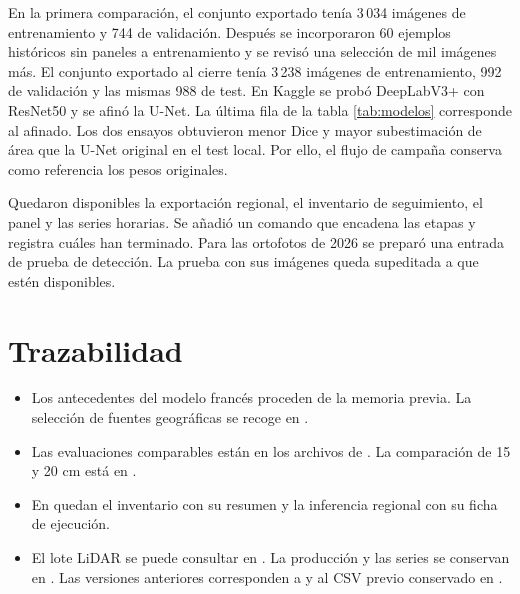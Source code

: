 \documentclass[11pt,a4paper]{article}
\begin{document}
En la primera comparación, el conjunto exportado tenía 3\,034 imágenes de entrenamiento y 744 de validación. Después se incorporaron 60 ejemplos históricos sin paneles a entrenamiento y se revisó una selección de mil imágenes más. El conjunto exportado al cierre tenía 3\,238 imágenes de entrenamiento, 992 de validación y las mismas 988 de test. En Kaggle se probó DeepLabV3+ con ResNet50 y se afinó la U-Net. La última fila de la tabla \ref{tab:modelos} corresponde al afinado. Los dos ensayos obtuvieron menor Dice y mayor subestimación de área que la U-Net original en el test local. Por ello, el flujo de campaña conserva como referencia los pesos originales.

Quedaron disponibles la exportación regional, el inventario de seguimiento, el panel y las series horarias. Se añadió un comando que encadena las etapas y registra cuáles han terminado. Para las ortofotos de 2026 se preparó una entrada de prueba de detección. La prueba con sus imágenes queda supeditada a que estén disponibles.

\section*{Trazabilidad}

\begin{itemize}
  \item Los antecedentes del modelo francés proceden de la memoria previa. La selección de fuentes geográficas se recoge en .
  \item Las evaluaciones comparables están en los archivos  de . La comparación de 15 y 20 cm está en .
  \item En  quedan el inventario  con su resumen y la inferencia regional  con su ficha de ejecución.
  \item El lote LiDAR se puede consultar en . La producción y las series se conservan en . Las versiones anteriores corresponden a  y al CSV previo conservado en .
\end{itemize}
\end{document}
